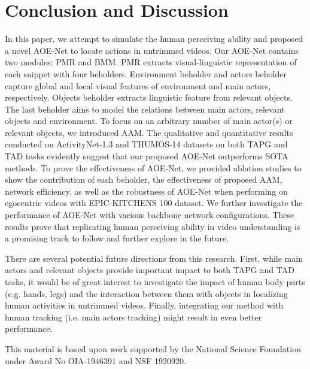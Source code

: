 \documentclass[sn-mathphys]{sn-jnl}
\theoremstyle{thmstyleone}\newtheorem{theorem}{Theorem}\newtheorem{proposition}[theorem]{Proposition}
\theoremstyle{thmstyletwo}\newtheorem{example}{Example}\newtheorem{remark}{Remark}
\theoremstyle{thmstylethree}\newtheorem{definition}{Definition}
\begin{document}
\vspace{-1mm}
\section{Conclusion and Discussion}
\vspace{-1mm}
In this paper, we attempt to simulate the human perceiving ability and proposed a novel AOE-Net to locate actions in untrimmed videos. Our AOE-Net contains two modules: PMR and BMM. PMR extracts visual-linguistic representation of each snippet with four beholders. Environment beholder and actors beholder capture global and local visual features of environment and main actors, respectively. Objects beholder extracts linguistic feature from relevant objects. The last beholder aims to model the relations between main actors, relevant objects and environment. To focus on an arbitrary number of main actor(s) or relevant objects, we introduced AAM. The qualitative and quantitative results conducted on ActivityNet-1.3 and THUMOS-14 datasets on both TAPG and TAD tasks evidently suggest that our proposed AOE-Net outperforms SOTA methods. To prove the effectiveness of AOE-Net, we provided ablation studies to show the contribution of each beholder, the effectiveness of proposed AAM, network efficiency, as well as the robustness of AOE-Net when performing on egocentric videos with EPIC-KITCHENS 100 dataset. We further investigate the performance of AOE-Net with various backbone network configurations. These results prove that replicating human perceiving ability in video understanding is a promising track to follow and further explore in the future. 

There are several potential future directions from this research. First, while main actors and relevant objects provide important impact to both TAPG and TAD tasks, it would be of great interest to investigate the impact of human body parts (e.g. hands, legs) and the interaction between them with objects in localizing human activities in untrimmed videos. Finally, integrating our method with human tracking (i.e. main actors tracking) might result in even better performance.

This material is based upon work supported by the National Science Foundation under Award No OIA-1946391 and NSF 1920920.

\newpage




\newpage
\end{document}
